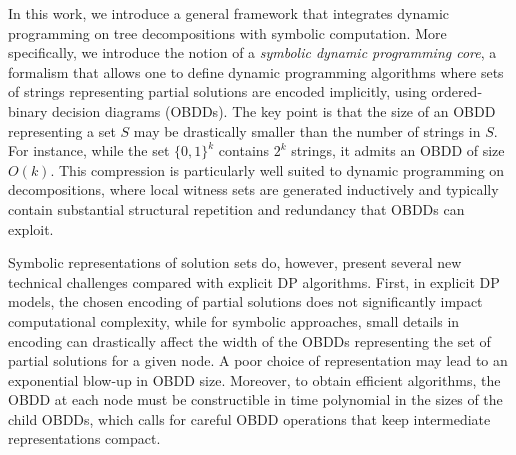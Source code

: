 In this work, we introduce a general framework that integrates dynamic programming on tree decompositions with symbolic computation. More specifically, we introduce the notion of a \emph{symbolic dynamic programming core}, a formalism that allows one to define dynamic programming algorithms where sets of strings representing partial solutions are encoded implicitly, using ordered-binary decision diagrams (OBDDs). The key point is that the size of an OBDD representing a set $S$ may be drastically smaller than the number of strings in $S$. For instance, while the set $\{0,1\}^k$ contains $2^k$ strings, it admits an OBDD of size $O(k)$. 
This compression is particularly well suited to dynamic programming on decompositions, where local witness sets are generated inductively and typically contain substantial structural repetition and redundancy that OBDDs can exploit.

Symbolic representations of solution sets do, however, present several new technical challenges compared with explicit DP algorithms. First, in explicit DP models, the chosen encoding of partial solutions does not significantly impact computational complexity, while for symbolic approaches, small details in encoding can drastically affect the width of the OBDDs representing the set of partial solutions for a given node. A poor choice of representation may lead to an exponential blow-up in OBDD size. Moreover, to obtain efficient algorithms, the OBDD at each node must be constructible in time polynomial in the sizes of the child OBDDs, which calls for careful OBDD operations that keep intermediate representations compact.

